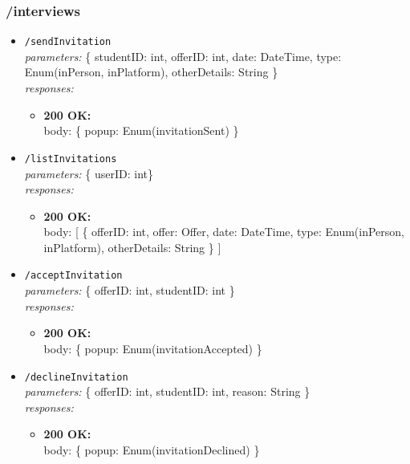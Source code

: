 \subsubsection*{/interviews}
\begin{itemize}
    \item \texttt{/sendInvitation} \\
        \textit{parameters:} \{ studentID: int, offerID: int, date: DateTime, type: Enum(inPerson, inPlatform), otherDetails: String \} \\
        \textit{responses:}
        \begin{itemize}
            \item \textbf{200 OK:} \\
            body: \{ popup: Enum(invitationSent) \}
        \end{itemize}
    \item \texttt{/listInvitations} \\
        \textit{parameters:} \{ userID: int\} \\
        \textit{responses:}
        \begin{itemize}
            \item \textbf{200 OK:} \\
            body: [ \{ offerID: int, offer: Offer, date: DateTime, type: Enum(inPerson, inPlatform), otherDetails: String \} ]
        \end{itemize}
    \item \texttt{/acceptInvitation} \\
        \textit{parameters:} \{ offerID: int, studentID: int \} \\
        \textit{responses:}
        \begin{itemize}
            \item \textbf{200 OK:} \\
            body: \{ popup: Enum(invitationAccepted) \}
        \end{itemize}
    \item \texttt{/declineInvitation} \\
        \textit{parameters:} \{ offerID: int, studentID: int, reason: String \} \\
        \textit{responses:}
        \begin{itemize}
            \item \textbf{200 OK:} \\
            body: \{ popup: Enum(invitationDeclined) \}
        \end{itemize}

\end{itemize}
